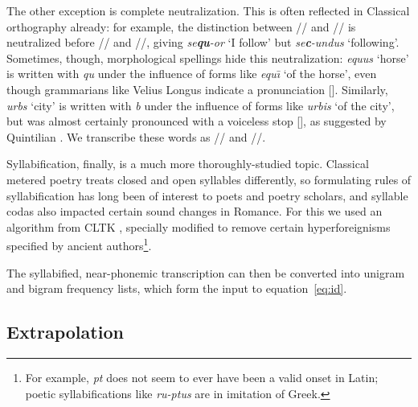 \documentclass[12pt,twoside]{article}
\newcommand{\ipa}[1]{/\textipa{#1}/}
\newcommand{\ipab}[1]{[\textipa{#1}]}
\begin{document}
The other exception is complete neutralization. This is often reflected in Classical orthography already: for example, the distinction between \ipa{k} and \ipa{k\super{w}} is neutralized before \ipa{u} and \ipa{u:}, giving \emph{se\textbf{qu}-or} `I follow' but \emph{se\textbf{c}-undus} `following'. Sometimes, though, morphological spellings hide this neutralization: \emph{equus} `horse' is written with \emph{qu} under the influence of forms like \emph{equ\=\i} `of the horse', even though grammarians like Velius Longus \citep[59.2-8]{longus} indicate a pronunciation \ipab{ekus}. Similarly, \emph{urbs} `city' is written with \emph{b} under the influence of forms like \emph{urbis} `of the city', but was almost certainly pronounced with a voiceless stop \ipab{urps}, as suggested by Quintilian \citep[I.7.7]{quintilian}. We transcribe these words as \ipa{ekus} and \ipa{urps}.

Syllabification, finally, is a much more thoroughly-studied topic. Classical metered poetry treats closed and open syllables differently, so formulating rules of syllabification has long been of interest to poets and poetry scholars, and syllable codas also impacted certain sound changes in Romance. For this we used an algorithm from CLTK \citep{cltk}, specially modified to remove certain hyperforeignisms specified by ancient authors\footnote{For example, \emph{pt} does not seem to ever have been a valid onset in Latin; poetic syllabifications like \emph{ru-ptus} are in imitation of Greek.}.

The syllabified, near-phonemic transcription can then be converted into unigram and bigram frequency lists, which form the input to equation~\ref{eq:id}.

\subsection{Extrapolation}
\end{document}
